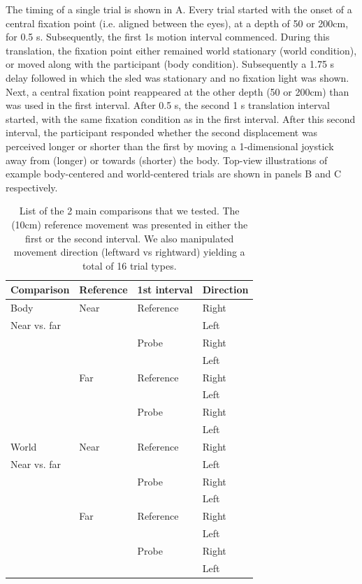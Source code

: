 The timing of a single trial is shown in A. Every trial started with the onset of a central fixation point (i.e. aligned between the eyes), at a depth of 50 or 200\si{\centi\metre}, for 0.5 \si{\second}. Subsequently, the first 1\si{\second} motion interval commenced. During this translation, the fixation point either remained world stationary (world condition), or moved along with the participant (body condition).  Subsequently a 1.75 \si{\second} delay followed in which the sled was stationary and no  fixation light was shown. Next, a central fixation point reappeared at the other depth (50 or 200\si{\centi\metre}) than was used in the first interval. After 0.5 \si{\second}, the second 1 \si{\second} translation interval started, with the same fixation condition as in the first interval. After this second interval, the participant responded whether the second displacement was perceived longer or shorter than the first by moving a 1-dimensional joystick away from (longer) or towards (shorter) the body. Top-view illustrations of example body-centered and world-centered trials are shown in  panels B and C respectively.

\begin{table}
    \begin{tabular}{llll}
    Comparison & Reference & 1st interval & Direction \\
    \hline
    Body & Near & Reference & Right \\
    Near vs. far & & & Left \\
    & & Probe & Right \\
    & & & Left \\
    \cline{2-4}
	& Far & Reference & Right \\
    & & & Left \\
    & & Probe & Right \\
    & & & Left \\
    \hline
    World & Near & Reference & Right \\
    Near vs. far & & & Left \\
    & & Probe & Right \\
    & & & Left \\
    \cline{2-4}
	& Far & Reference & Right \\
    & & & Left \\
    & & Probe & Right \\
    & & & Left \\
    \end{tabular}

    \caption{List of the 2 main comparisons that we tested. The (10cm) reference movement was presented in either the first or the second interval. We also manipulated movement direction (leftward vs rightward) yielding a total of 16 trial types.}

    \label{p4:tab1}
\end{table}

